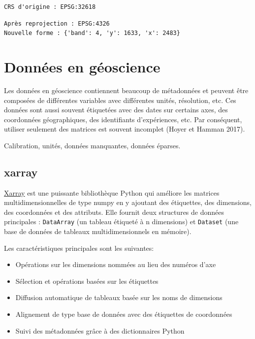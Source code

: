 \documentclass[
  french,
  11pt,
  letterpaper,
  open=any,
  twoside=false,
  french]{scrbook}
\begin{document}
\begin{verbatim}
CRS d'origine : EPSG:32618
\end{verbatim}

\begin{verbatim}
Après reprojection : EPSG:4326
Nouvelle forme : {'band': 4, 'y': 1633, 'x': 2483}
\end{verbatim}

\section{Données en géoscience}\label{donnuxe9es-en-guxe9oscience}

Les données en géoscience contiennent beaucoup de métadonnées et peuvent
être composées de différentes variables avec différentes unités,
résolution, etc. Ces données sont aussi souvent étiquetées avec des
dates sur certains axes, des coordonnées géographiques, des identifiants
d'expériences, etc. Par conséquent, utiliser seulement des matrices est
souvent incomplet (Hoyer et Hamman 2017).

Calibration, unités, données manquantes, données éparses.

\subsection{xarray}\label{xarray}

\href{https://docs.xarray.dev/en/latest/getting-started-guide/why-xarray.html}{Xarray}
est une puissante bibliothèque Python qui améliore les matrices
multidimensionnelles de type numpy en y ajoutant des étiquettes, des
dimensions, des coordonnées et des attributs. Elle fournit deux
structures de données principales : \texttt{DataArray} (un tableau
étiqueté à n dimensions) et \texttt{Dataset} (une base de données de
tableaux multidimensionnels en mémoire).

Les caractéristiques principales sont les suivantes:

\begin{itemize}
\item
  Opérations sur les dimensions nommées au lieu des numéros d'axe
\item
  Sélection et opérations basées sur les étiquettes
\item
  Diffusion automatique de tableaux basée sur les noms de dimensions
\item
  Alignement de type base de données avec des étiquettes de coordonnées
\item
  Suivi des métadonnées grâce à des dictionnaires Python
\end{itemize}
\end{document}
